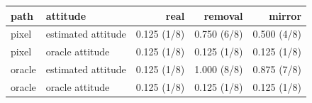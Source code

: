\footnotesize
\begin{tabular}{llrrr}
\toprule
path & attitude & real & removal & mirror \\
\midrule
pixel & estimated attitude & 0.125 (1/8) & 0.750 (6/8) & 0.500 (4/8) \\
pixel & oracle attitude & 0.125 (1/8) & 0.125 (1/8) & 0.125 (1/8) \\
oracle & estimated attitude & 0.125 (1/8) & 1.000 (8/8) & 0.875 (7/8) \\
oracle & oracle attitude & 0.125 (1/8) & 0.125 (1/8) & 0.125 (1/8) \\
\bottomrule
\end{tabular}
